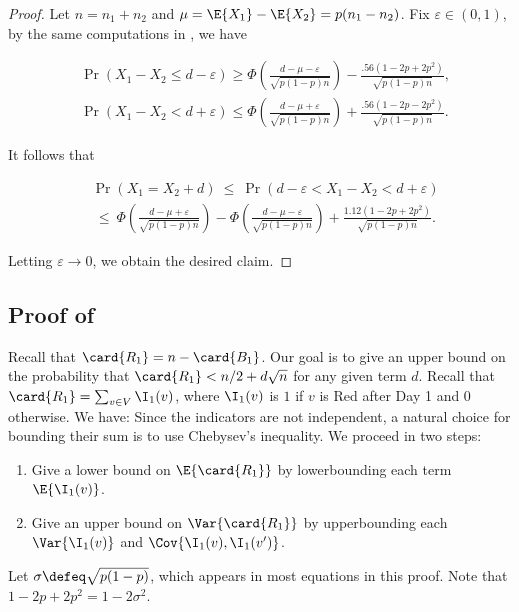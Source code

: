 \documentclass{toc}
\begin{document}
			\begin{proof}
				Let $n = n_1+n_2$ and $\mu = \E{X_1} - \E{X_2} = p(n_1 - n_2)$. Fix $\varepsilon \in (0, 1)$, by the same computations in , we have
				\begin{linenomath}\begin{equation*} \label{eq:temp001}
						\begin{aligned}
							& \Pr\left(X_1 - X_2 \le d - \varepsilon\right) \ge
							\Phi\left(\frac{d - \mu - \varepsilon}{\sqrt{p(1 - p)n}}\right)
							- \frac{.56\left(1 - 2p + 2p^2\right)}{\sqrt{p(1 - p)n}}, \\
							& \Pr\left(X_1 - X_2 < d + \varepsilon\right) \le
							\Phi\left(\frac{d - \mu + \varepsilon}{\sqrt{p(1 - p)n}}\right)
							+ \frac{.56\left(1 - 2p - 2p^2\right)}{\sqrt{p(1 - p)n}}.
						\end{aligned}
				\end{equation*}\end{linenomath}
				It follows that
				\begin{linenomath}\begin{equation*}
						\begin{aligned}
							& \Pr(X_1 = X_2 + d)
							\ \le \ \Pr(d - \varepsilon < X_1 - X_2 < d + \varepsilon)\\
							& \ \le \ \Phi\left(\frac{d - \mu + \varepsilon}{\sqrt{p(1 - p)n}}\right) -
							\Phi\left(\frac{d - \mu - \varepsilon}{\sqrt{p(1 - p)n}}\right) + \frac{1.12\left(1 - 2p + 2p^2\right)}{\sqrt{p(1 - p)n}}.
						\end{aligned}
				\end{equation*}\end{linenomath}
				Letting $\varepsilon \to 0$, we obtain the desired claim.
			\end{proof}
			
			\subsection*{Proof of }
			
			Recall that $\card{R_1} = n - \card{B_1}$. Our goal is to 
			give an upper bound on  %
			the probability that $\card{R_1} < n/2 + d\sqrt{n}$ for any given term $d$.
			Recall that $\card{R_1} = \sum_{v\in V}\I_1(v)$, where $\I_1(v) $ is $1$ if $v$ is Red after Day 1 and $0$ otherwise. We have:
			Since the indicators are not independent, a natural choice for bounding their sum is to use Chebysev's inequality. We proceed in two steps:
			\begin{enumerate}
				\item Give a lower bound on $\E{\card{R_1}}$ by lowerbounding  %
				each term $\E{\I_1(v)}$.  
				\item Give an upper bound on $\Var{\card{R_1}}$ by upperbounding %
				each $\Var{\I_1(v)}$ and $\Cov{\I_1(v), \I_1(v')}$.
			\end{enumerate}
			Let $\sigma \defeq \sqrt{p(1 - p)}$, which appears in most equations in this proof.
			Note that $1 - 2p + 2p^2 = 1 - 2\sigma^2$.
			
\end{document}
